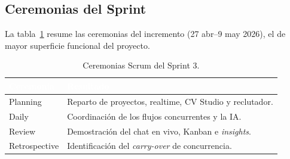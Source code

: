 \subsection{Ceremonias del Sprint}
\label{ssec:s3_ceremonias}
La tabla~\ref{tab:s3_ceremonias} resume las ceremonias del incremento (27 abr--9 may 2026), el de
mayor superficie funcional del proyecto.

\clearpage
\begin{table}[!ht]
    \centering
    \renewcommand{\arraystretch}{1.3}
    \fontsize{9}{10.8}\selectfont\sffamily
    \begin{tabularx}{\textwidth}{|l|X|}
        \hline
        \rowcolor{colorPrimario}
        \textcolor{white}{\textbf{Ceremonia}} & \textcolor{white}{\textbf{Resultado}} \\ \hline
        Planning & Reparto de proyectos, realtime, CV Studio y reclutador. \\ \hline
        \rowcolor{grisTecnico}
        Daily & Coordinación de los flujos concurrentes y la IA. \\ \hline
        Review & Demostración del chat en vivo, Kanban e \textit{insights}. \\ \hline
        \rowcolor{grisTecnico}
        Retrospective & Identificación del \textit{carry-over} de concurrencia. \\ \hline
    \end{tabularx}
    \caption{Ceremonias Scrum del Sprint 3.}
    \label{tab:s3_ceremonias}
\end{table}

\clearpage
